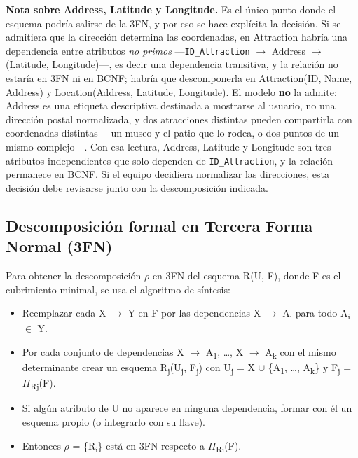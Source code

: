 \documentclass[11pt,a4paper]{article}
\begin{document}
\textbf{Nota sobre Address, Latitude y Longitude.} Es el único punto donde el esquema podría salirse de la 3FN, y por eso se hace explícita la decisión. Si se admitiera que la dirección determina las coordenadas, en Attraction habría una dependencia entre atributos \textit{no primos} —\texttt{ID\_Attraction} \ensuremath{\rightarrow} Address \ensuremath{\rightarrow} (Latitude, Longitude)—, es decir una dependencia transitiva, y la relación no estaría en 3FN ni en BCNF; habría que descomponerla en Attraction(\underline{ID}, Name, Address) y Location(\underline{Address}, Latitude, Longitude). El modelo \textbf{no} la admite: Address es una etiqueta descriptiva destinada a mostrarse al usuario, no una dirección postal normalizada, y dos atracciones distintas pueden compartirla con coordenadas distintas —un museo y el patio que lo rodea, o dos puntos de un mismo complejo—. Con esa lectura, Address, Latitude y Longitude son tres atributos independientes que solo dependen de \texttt{ID\_Attraction}, y la relación permanece en BCNF. Si el equipo decidiera normalizar las direcciones, esta decisión debe revisarse junto con la descomposición indicada.

\subsection{Descomposición formal en Tercera Forma Normal (3FN)}
Para obtener la descomposición \ensuremath{\rho} en 3FN del esquema R(U, F), donde F es el cubrimiento minimal, se usa el algoritmo de síntesis:

\begin{itemize}[leftmargin=1.2em,itemsep=2pt,topsep=3pt]
\item Reemplazar cada X \ensuremath{\rightarrow} Y en F por las dependencias X \ensuremath{\rightarrow} A\textsubscript{i} para todo A\textsubscript{i} \ensuremath{\in} Y.
\item Por cada conjunto de dependencias X \ensuremath{\rightarrow} A\textsubscript{1}, …, X \ensuremath{\rightarrow} A\textsubscript{k} con el mismo determinante crear un esquema R\textsubscript{j}(U\textsubscript{j}, F\textsubscript{j}) con U\textsubscript{j} = X \ensuremath{\cup} \{A\textsubscript{1}, …, A\textsubscript{k}\} y F\textsubscript{j} = \ensuremath{\Pi}\textsubscript{Rj}(F).
\item Si algún atributo de U no aparece en ninguna dependencia, formar con él un esquema propio (o integrarlo con su llave).
\item Entonces \ensuremath{\rho} = \{R\textsubscript{i}\} está en 3FN respecto a \ensuremath{\Pi}\textsubscript{Ri}(F).
\end{itemize}
\end{document}
